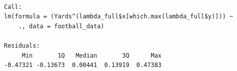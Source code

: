 \documentclass[
  super,
  preprint,
  3p]{elsarticle}
\newenvironment{Shaded}{\begin{snugshade}}{\end{snugshade}}
\newcommand{\AttributeTok}[1]{\textcolor[rgb]{0.40,0.45,0.13}{#1}}
\newcommand{\FunctionTok}[1]{\textcolor[rgb]{0.28,0.35,0.67}{#1}}
\newcommand{\NormalTok}[1]{\textcolor[rgb]{0.00,0.23,0.31}{#1}}
\newcommand{\OtherTok}[1]{\textcolor[rgb]{0.00,0.23,0.31}{#1}}
\newcommand{\SpecialCharTok}[1]{\textcolor[rgb]{0.37,0.37,0.37}{#1}}
\begin{document}
\begin{Shaded}
\end{Shaded}

\begin{verbatim}

Call:
lm(formula = (Yards^(lambda_full$x[which.max(lambda_full$y)])) ~ 
    ., data = football_data)

Residuals:
     Min       1Q   Median       3Q      Max 
-0.47321 -0.13673  0.00441  0.13919  0.47383 


\end{verbatim}
\end{document}
